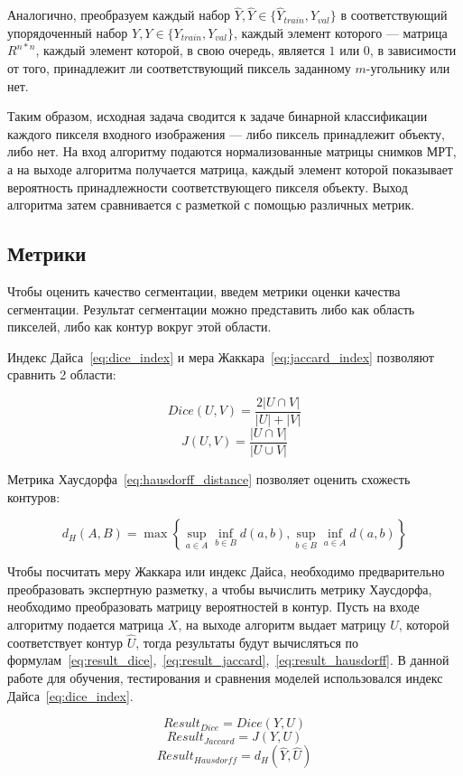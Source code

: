 Аналогично, преобразуем каждый набор $\hat{Y},\hat{Y}\in{}\{\hat{Y}_{train},\hat{Y}_{val}\}$ в соответствующий упорядоченный набор $Y,Y\in{}\{Y_{train},Y_{val}\}$, каждый элемент которого — матрица $R^{n*n}$, каждый элемент которой, в свою очередь, является $1$ или $0$, в зависимости от того, принадлежит ли соответствующий пиксель заданному \mbox{$m$-угольнику} или нет.

Таким образом, исходная задача сводится к задаче бинарной классификации каждого пикселя входного изображения — либо пиксель принадлежит объекту, либо нет. На вход алгоритму подаются нормализованные матрицы снимков МРТ, а на выходе алгоритма получается матрица, каждый элемент которой показывает вероятность принадлежности соответствующего пикселя объекту. Выход алгоритма затем сравнивается с разметкой с помощью различных метрик.

\subsection{Метрики}

Чтобы оценить качество сегментации, введем метрики оценки качества сегментации. Результат сегментации можно представить либо как область пикселей, либо как контур вокруг этой области. 

Индекс Дайса~\eqref{eq:dice_index} и мера Жаккара~\eqref{eq:jaccard_index} позволяют сравнить 2 области:

\begin{equation}\label{eq:dice_index}
  Dice(U,V) = \frac{2|U\cap{}V|}{|U| + |V|}
\end{equation}
\begin{equation}\label{eq:jaccard_index}
  J(U,V) = \frac{|U\cap{}V|}{|U\cup{}V|}
\end{equation}

Метрика Хаусдорфа~\eqref{eq:hausdorff_distance} позволяет оценить схожесть контуров:

\begin{equation}\label{eq:hausdorff_distance}
  d_{H}(A,B)=\max\left\{\sup_{a\in{}A}\inf_{b\in{}B}d(a,b),\sup_{b\in{}B}\inf_{a\in{}A}d(a,b)\right\}
\end{equation}

\clearpage
Чтобы посчитать меру Жаккара или индекс Дайса, необходимо 
предварительно преобразовать экспертную разметку, а чтобы 
вычислить метрику Хаусдорфа, необходимо преобразовать матрицу 
вероятностей в контур. Пусть на входе алгоритму подается 
матрица $X$, на выходе алгоритм выдает матрицу $U$, которой
соответствует контур $\hat{U}$, тогда результаты будут 
вычисляться по формулам~\eqref{eq:result_dice},~\eqref{eq:result_jaccard},~\eqref{eq:result_hausdorff}. В данной работе для обучения, тестирования и сравнения моделей использовался индекс Дайса~\eqref{eq:dice_index}.

\begin{equation}\label{eq:result_dice}
  Result_{Dice} = Dice(Y, U)
\end{equation}
\begin{equation}\label{eq:result_jaccard}
  Result_{Jaccard} = J(Y, U)
\end{equation}
\begin{equation}\label{eq:result_hausdorff}
  Result_{Hausdorff} = d_{H}(\hat{Y}, \hat{U})
\end{equation}
